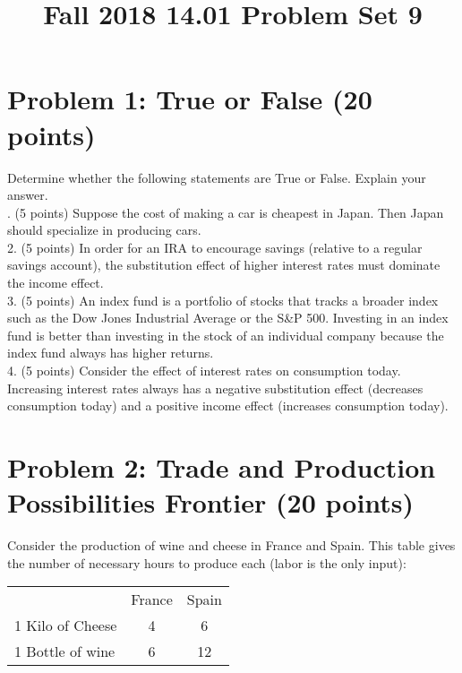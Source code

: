 \documentclass{article}
\begin{document}
\title{Fall 2018 14.01 Problem Set 9}
\maketitle{}

\section*{Problem 1: True or False (20 points)} 
Determine whether the following statements are True or False. Explain your answer.\\

. (5 points) Suppose the cost of making a car is cheapest in Japan. Then Japan should specialize in producing cars.\\
2. (5 points) In order for an IRA to encourage savings (relative to a regular savings account), the substitution effect of higher interest rates must dominate the income effect.\\
3. (5 points) An index fund is a portfolio of stocks that tracks a broader index such as the Dow Jones Industrial Average or the S\&P 500. Investing in an index fund is better than investing in the stock of an individual company because the index fund always has higher returns.\\
4. (5 points) Consider the effect of interest rates on consumption today. Increasing interest rates always has a negative substitution effect (decreases consumption today) and a positive income effect (increases consumption today).\\

\section*{Problem 2: Trade and Production Possibilities Frontier (20 points)} 
Consider the production of wine and cheese in France and Spain. This table gives the number of necessary hours to produce each (labor is the only input):\\

\noindent
\begin{tabular}{lcc}
 & France & Spain\\
1 Kilo of Cheese & 4 & 6\\
1 Bottle of wine & 6 & 12
\end{tabular}
\end{document}
